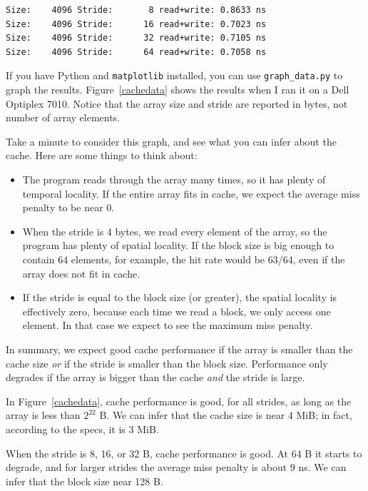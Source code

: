 \documentclass[12pt]{book}
\begin{document}
{\begin{verbatim}
Size:    4096 Stride:       8 read+write: 0.8633 ns
Size:    4096 Stride:      16 read+write: 0.7023 ns
Size:    4096 Stride:      32 read+write: 0.7105 ns
Size:    4096 Stride:      64 read+write: 0.7058 ns
\end{verbatim}

If you have Python and {\tt matplotlib} installed, you can use
\verb"graph_data.py" to graph the results.  Figure~\ref{cachedata}
shows the results when I ran it on a Dell Optiplex 7010.
Notice that the array size and stride are reported in
bytes, not number of array elements.

Take a minute to consider this graph, and see what you can infer
about the cache.  Here are some things to think about:

\begin{itemize}

\item The program reads through the array many times, so it has plenty
  of temporal locality.  If the entire array fits in cache, we expect
  the average miss penalty to be near 0.

\item When the stride is 4 bytes, we read every element of the array,
  so the program has plenty of spatial locality.  If the block size is
  big enough to contain 64 elements, for example, the hit rate would
  be 63/64, even if the array does not fit in cache.

\item If the stride is equal to the block size (or greater), the
  spatial locality is effectively zero, because each time we read a
  block, we only access one element.  In that case we expect to see
  the maximum miss penalty.

\end{itemize}

In summary, we expect good cache performance if the array is smaller
than the cache size {\em or} if the stride is smaller than the block
size.  Performance only degrades if the array is bigger than the
cache {\em and} the stride is large.

In Figure~\ref{cachedata}, cache performance is good, for all strides,
as long as the array is less than $2^{22}$ B.  We can infer that the
cache size is near 4 MiB; in fact, according to the specs, it is 3
MiB.

When the stride is 8, 16, or 32 B, cache performance is good.  At 64 B
it starts to degrade, and for larger strides the average miss
penalty is about 9 ns.  We can infer that the block size near 128 B.

}
\end{document}
